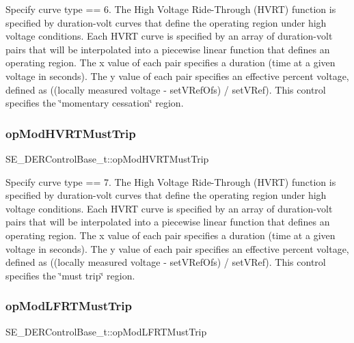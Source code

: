 Specify curve type == 6. The High Voltage Ride-\/\+Through (H\+V\+RT) function is specified by duration-\/volt curves that define the operating region under high voltage conditions. Each H\+V\+RT curve is specified by an array of duration-\/volt pairs that will be interpolated into a piecewise linear function that defines an operating region. The x value of each pair specifies a duration (time at a given voltage in seconds). The y value of each pair specifies an effective percent voltage, defined as ((locally measured voltage -\/ set\+V\+Ref\+Ofs) / set\+V\+Ref). This control specifies the \char`\"{}momentary cessation\char`\"{} region. \mbox{\label{group__DERControlBase_ga6117ce2942b55045220c21fc407bae79}} 
\subsubsection{\texorpdfstring{op\+Mod\+H\+V\+R\+T\+Must\+Trip}{opModHVRTMustTrip}}
{\footnotesize\ttfamily S\+E\+\_\+\+D\+E\+R\+Control\+Base\+\_\+t\+::op\+Mod\+H\+V\+R\+T\+Must\+Trip}

Specify curve type == 7. The High Voltage Ride-\/\+Through (H\+V\+RT) function is specified by duration-\/volt curves that define the operating region under high voltage conditions. Each H\+V\+RT curve is specified by an array of duration-\/volt pairs that will be interpolated into a piecewise linear function that defines an operating region. The x value of each pair specifies a duration (time at a given voltage in seconds). The y value of each pair specifies an effective percent voltage, defined as ((locally measured voltage -\/ set\+V\+Ref\+Ofs) / set\+V\+Ref). This control specifies the \char`\"{}must trip\char`\"{} region. \mbox{\label{group__DERControlBase_ga358ba75007797cfce59e113e52eac3d8}} 
\subsubsection{\texorpdfstring{op\+Mod\+L\+F\+R\+T\+Must\+Trip}{opModLFRTMustTrip}}
{\footnotesize\ttfamily S\+E\+\_\+\+D\+E\+R\+Control\+Base\+\_\+t\+::op\+Mod\+L\+F\+R\+T\+Must\+Trip}

